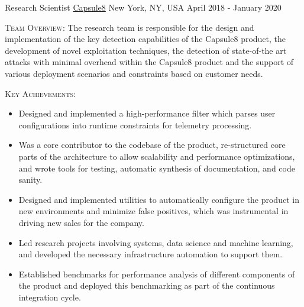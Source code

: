 

\begin{cventries}

  \cventry
    {Research Scientist}
		{\href{https://capsule8.com/}{Capsule8}} %
    {New York, NY, USA}
    {April 2018 - January 2020}
    {
      \begin{cvitems} %
      \item[]{\textsc{Team Overview}: The research team is responsible for the design and implementation of the key detection capabilities of the Capsule8 product, the development
          of novel exploitation techniques, the detection of state-of-the art attacks with minimal overhead within the Capsule8 product and the support of various deployment scenarios and constraints based on customer needs.}
      \item[] {\textsc{Key Achievements}:
          \begin{itemize}
                \item Designed and implemented a high-performance filter which parses user configurations into runtime constraints for telemetry processing.
                \item Was a core contributor to the codebase of the product, re-structured core parts of the architecture to allow scalability and performance optimizations, and wrote tools for testing, automatic synthesis of documentation, and code sanity.
                \item Designed and implemented utilities to automatically configure the product in new environments and minimize false positives, which was instrumental in driving new sales for the company.
                \item Led research projects involving systems, data science and machine learning, and developed the necessary infrastructure automation to support them.
                \item Established benchmarks for performance analysis of different components of the product and deployed this benchmarking as part of the continuous integration cycle.
        \end{itemize}
}
\end{cvitems}}
\end{cventries}
